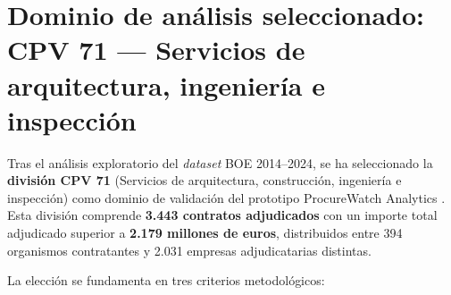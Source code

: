 \documentclass[11pt,a4paper,spanish]{book}
\numberwithin{equation}{chapter}
\numberwithin{figure}{chapter}
\begin{document}
\section{Dominio de an{\'a}lisis seleccionado: CPV 71 --- Servicios de arquitectura, ingenier{\'i}a e inspecci{\'o}n}
\label{sec:dominio_cpv71}

Tras el an{\'a}lisis exploratorio del \textit{dataset} BOE 2014--2024, se ha seleccionado la \textbf{divisi{\'o}n CPV 71} (Servicios de arquitectura, construcci{\'o}n, ingenier{\'i}a e inspecci{\'o}n) como dominio de validaci{\'o}n del prototipo ProcureWatch Analytics \cite{CPVCodes71}. Esta divisi{\'o}n comprende \textbf{3.443 contratos adjudicados} con un importe total adjudicado superior a \textbf{2.179 millones de euros}, distribuidos entre 394 organismos contratantes y 2.031 empresas adjudicatarias distintas.

La elecci{\'o}n se fundamenta en tres criterios metodol{\'o}gicos:
\end{document}
